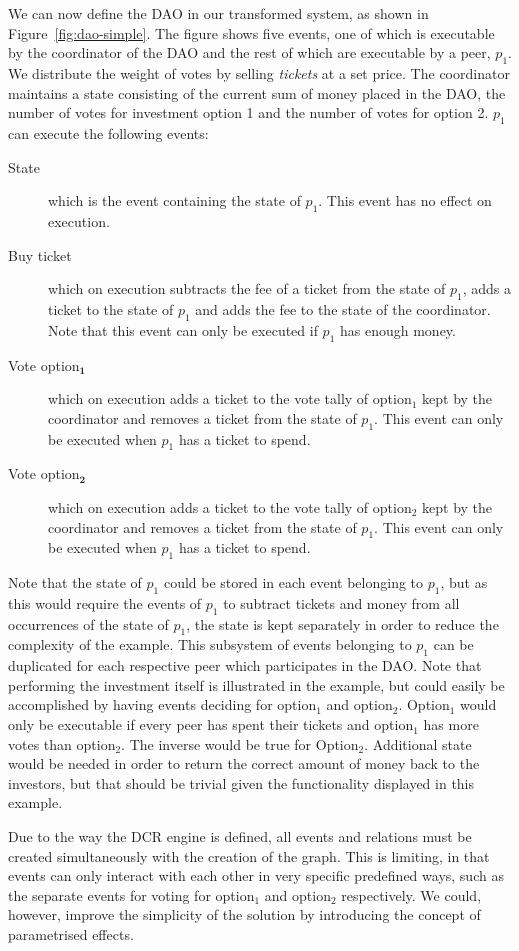 \documentclass{article}
\begin{document}
	We can now define the DAO in our transformed system, as shown in Figure~\ref{fig:dao-simple}.
	The figure shows five events, one of which is executable by the coordinator of the DAO and the rest of which are executable by a peer, $p_1$.
	We distribute the weight of votes by selling \textit{tickets} at a set price.
	The coordinator maintains a state consisting of the current sum of money placed in the DAO, the number of votes for investment option 1 and the number of votes for option 2.
	$p_1$ can execute the following events:
	\begin{description}
		\item[State] which is the event containing the state of $p_1$. This event has no effect on execution.
		\item[Buy ticket] which on execution subtracts the fee of a ticket from the state of $p_1$, adds a ticket to the state of $p_1$ and adds the fee to the state of the coordinator.
		Note that this event can only be executed if $p_1$ has enough money.
		\item[Vote option$_\textbf{1}$] which on execution adds a ticket to the vote tally of option$_1$ kept by the coordinator and removes a ticket from the state of $p_1$.
		This event can only be executed when $p_1$ has a ticket to spend.
		\item[Vote option$_\textbf{2}$] which on execution adds a ticket to the vote tally of option$_2$ kept by the coordinator and removes a ticket from the state of $p_1$.
		This event can only be executed when $p_1$ has a ticket to spend.
	\end{description}
	Note that the state of $p_1$ could be stored in each event belonging to $p_1$, but as this would require the events of $p_1$ to subtract tickets and money from all occurrences of the state of $p_1$, the state is kept separately in order to reduce the complexity of the example.
	This subsystem of events belonging to $p_1$ can be duplicated for each respective peer which participates in the DAO.
	Note that performing the investment itself is illustrated in the example, but could easily be accomplished by having events deciding for option$_1$ and option$_2$.
	Option$_1$ would only be executable if every peer has spent their tickets and option$_1$ has more votes than option$_2$.
	The inverse would be true for Option$_2$.
	Additional state would be needed in order to return the correct amount of money back to the investors, but that should be trivial given the functionality displayed in this example.

	Due to the way the DCR engine is defined, all events and relations must be created simultaneously with the creation of the graph.
	This is limiting, in that events can only interact with each other in very specific predefined ways, such as the separate events for voting for option$_1$ and option$_2$ respectively.
	We could, however, improve the simplicity of the solution by introducing the concept of parametrised effects.
\end{document}
